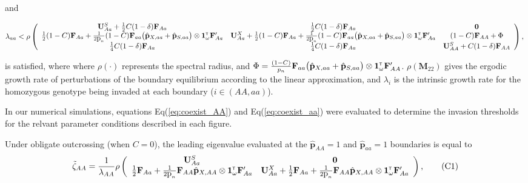 \documentclass[11pt,draft]{article}
\newcommand\numberthis{\addtocounter{equation}{1}\tag{\theequation}}
\def\mbf#1{\mathbf{#1}}
\newcommand{\tr}{{\mbox{\tiny \sf T}}}
\begin{document}
\begin{landscape}
{\noindent and 
\begin{linenomath*}
 \begin{equation} \label{eq:coexist_aa}
	\lambda_{aa} < 
			\rho\left(\begin{array}{ccc}
\mathbf{U}^S_{Aa} +\frac{1}{2} C (1 - \delta) \mbf{F}_{Aa} & \frac{1}{2} C (1 - \delta) \mbf{F}_{Aa}  & \mbf{0} \\
 \frac{1}{2} (1 - C) \mbf{F}_{Aa}+\frac{1}{2  \mbox{p}_{n}} (1 - C)\mbf{F}_{aa} \big(\hat{\mbf{p}}_{X,aa}+ \hat{\mbf{p}}_{S,aa}  \big) \otimes \mathbf{1}^\tr_{\omega} \mathbf{F}_{Aa}^\prime &\mathbf{U}^X_{Aa} + \frac{1}{2} (1 - C) \mbf{F}_{Aa} +\frac{1}{2  \mbox{p}_{n}} (1 - C)\mbf{F}_{aa} \big(\hat{\mbf{p}}_{X,aa}+ \hat{\mbf{p}}_{S,aa}  \big) \otimes \mathbf{1}^\tr_{\omega} \mathbf{F}_{Aa}^\prime & (1-C)\mbf{F}_{AA} + \Phi\\
  \frac{1}{4} C (1 - \delta) \mbf{F}_{Aa} & \frac{1}{4} C (1 - \delta) \mbf{F}_{Aa}  &\mathbf{U}^S_{AA} + C (1 - \delta) \mbf{F}_{AA}  \\ 
			\end{array} \right), \\ 
\end{equation} 
\end{linenomath*}
 }

\noindent is satisfied, where where $\rho(\cdot)$ represents the spectral radius, and $\Phi = \frac{(1 - C)}{p_{n}} \mbf{F}_{aa} \big(\hat{\mbf{p}}_{X,aa}+ \hat{\mbf{p}}_{S,aa}  \big) \otimes \mathbf{1}^\tr_{\omega} \mathbf{F}_{AA}^\prime$. $\rho(\mbf{M}_{22})$ gives the ergodic growth rate of perturbations of the boundary equilibrium according to the linear approximation, and $\lambda_i$ is the intrinsic growth rate for the homozygous genotype being invaded at each boundary ($i \in (AA,aa)$). 

In our numerical simulations, equations Eq(\ref{eq:coexist_AA}) and Eq(\ref{eq:coexist_aa}) were evaluated to determine the invasion thresholds for the relvant parameter conditions described in each figure.
\end{landscape}

Under obligate outcrossing (when $C=0$), the leading eigenvalue evaluated at the $\hat{\mbf{p}}_{AA} = 1$ and $\hat{\mbf{p}}_{aa} = 1$ boundaries is equal to
\begin{align*} \label{eq:eigAAOut}
	\tilde{\zeta}_{AA} = 
		\frac{1}{\lambda_{AA}}\rho\left(\begin{array}{cc}
\mathbf{U}^S_{Aa}  & \mathbf{0} \\
 \frac{1}{2} \mbf{F}_{Aa}+\frac{1}{2\mbox{p}_{n}}\mbf{F}_{AA} \hat{\mbf{p}}_{X,AA} \otimes \mathbf{1}^\tr_{\omega} \mathbf{F}_{Aa}^\prime &\mathbf{U}^X_{Aa} + \frac{1}{2} \mbf{F}_{Aa} +\frac{1}{2\mbox{p}_{n}} \mbf{F}_{AA} \hat{\mbf{p}}_{X,AA} \otimes \mathbf{1}^\tr_{\omega} \mathbf{F}_{Aa}^\prime
			\end{array} \right), \numberthis
\end{align*}
\end{document}
